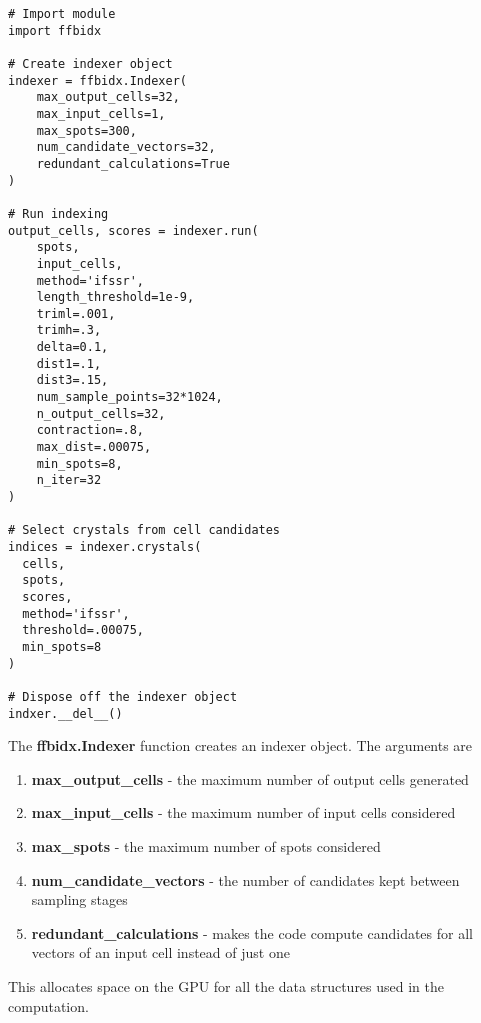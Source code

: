 \documentclass[a4paper,10pt]{article}
\begin{document}
\begin{lstlisting}
# Import module
import ffbidx

# Create indexer object
indexer = ffbidx.Indexer(
    max_output_cells=32,
    max_input_cells=1,
    max_spots=300,
    num_candidate_vectors=32,
    redundant_calculations=True
)

# Run indexing
output_cells, scores = indexer.run(
    spots,
    input_cells,
    method='ifssr',
    length_threshold=1e-9,
    triml=.001,
    trimh=.3,
    delta=0.1,
    dist1=.1,
    dist3=.15,
    num_sample_points=32*1024,
    n_output_cells=32,
    contraction=.8,
    max_dist=.00075,
    min_spots=8,
    n_iter=32
)

# Select crystals from cell candidates
indices = indexer.crystals(
  cells,
  spots,
  scores,
  method='ifssr',
  threshold=.00075,
  min_spots=8
)

# Dispose off the indexer object
indxer.__del__()
\end{lstlisting}
%
The \textbf{ffbidx.Indexer} function creates an indexer object. The arguments are
%
\begin{enumerate}
 \item \textbf{max\_output\_cells} - the maximum number of output cells generated
 \item \textbf{max\_input\_cells} - the maximum number of input cells considered
 \item \textbf{max\_spots} - the maximum number of spots considered
 \item \textbf{num\_candidate\_vectors} - the number of candidates kept between sampling stages
 \item \textbf{redundant\_calculations} - makes the code compute candidates for all vectors of an input cell instead of just one
\end{enumerate}
%
This allocates space on the GPU for all the data structures used in the computation.
\end{document}
